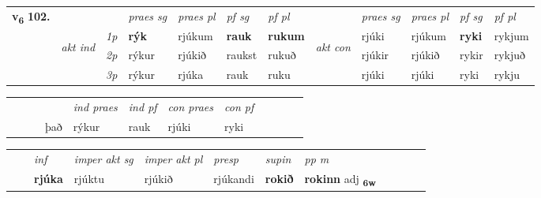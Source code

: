 \begin{tabular}{llllllllllll} \toprule
\multirow{4}{*}{{{\textbf{v{\textsubscript{6}}} \Large{\textbf{102.}}}}}  & &   &  \textit{praes sg}  & \textit{praes pl}  &\textit{ pf sg} & \textit{pf pl} &  &  \textit{praes sg}  & \textit{praes pl}  & \textit{pf sg} & \textit{pf pl } \\*
	\cmidrule{4-7} \cmidrule{9-12}
 & \multirow{3}{*}{\begin{turn}{90}\textit{akt ind}\end{turn}} & {\textit{1p}} & \textbf{rýk} & rjúkum    & \textbf{rauk} & \textbf{rukum} & \multirow{3}{*}{\begin{turn}{90}\textit{akt con}\end{turn}} &rjúki & rjúkum & \textbf{ryki} & rykjum\\*
& &  {\textit{2p}} &  rýkur  & rjúkið   & raukst & rukuð & & rjúkir & rjúkið & rykir & rykjuð \\*
& &  {\textit{3p}} & rýkur & rjúka   & rauk & ruku & & rjúki & rjúki& ryki & rykju  \\*
\cmidrule{4-7} \cmidrule{9-12}
\end{tabular}


\begin{tabular}{llllllllllll}
 & &  & &  \textit{ind praes} & \textit{ind pf} & \textit{con praes} & \textit{con pf} \\*
&  & & það & rýkur & rauk & rjúki & ryki \\*
\cmidrule{5-9}
\end{tabular}


\begin{tabular}{llllllllllll}
 & & \textit{inf} & \textit{imper akt sg} & \textit{imper akt pl}   & \textit{presp} & \textit{supin}  & \textit{pp m}     \\*
  & & \textbf{rjúka} & rjúktu  & rjúkið   & rjúkandi &  \textbf{rokið}  & \textbf{rokinn} adj \textbf{\textsubscript{6w}} \\*
\cmidrule{1-12}
\end{tabular}



